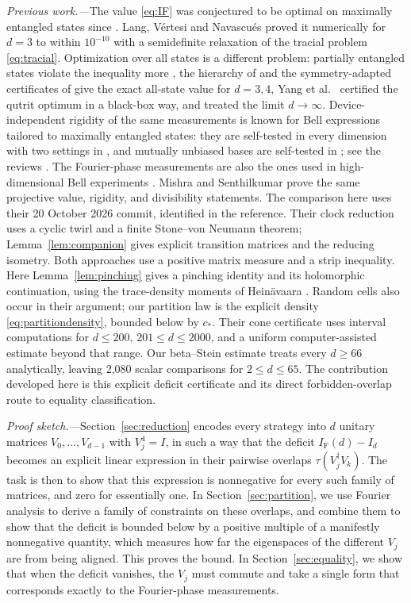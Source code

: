 \documentclass[aps,prl,reprint,superscriptaddress,longbibliography,floatfix,raggedbottom]{revtex4-2}
\newcommand{\tr}{\tau}
\newcommand{\IF}{I_{\mathrm F}}
\begin{document}
\emph{Previous work.---}The value \eqref{eq:IF} was conjectured to be
optimal on maximally entangled states since \cite{DKZ}. Lang, V\'ertesi
and Navascu\'es \cite{LVN} proved it numerically for $d=3$ to within
$10^{-10}$ with a semidefinite relaxation of the tracial problem
\eqref{eq:tracial}. Optimization over all states is a different problem:
partially entangled states violate the inequality more \cite{ADGL}, the
hierarchy of \cite{NPA} and the symmetry-adapted certificates of
\cite{IR} give the exact all-state value for $d=3,4$, Yang et al.\
\cite{Yang} certified the qutrit optimum in a black-box way, and
\cite{ZG,ZRGW} treated the limit $d\to\infty$. Device-independent
rigidity of the same measurements is known for Bell expressions tailored
to maximally entangled states: they are self-tested in every dimension
with two settings in \cite{SATWAP,Sarkar}, and mutually unbiased bases
are self-tested in \cite{Kaniewski,Tavakoli21}; see the reviews
\cite{Brunner,SupicBowles}. The Fourier-phase measurements are also the
ones used in high-dimensional Bell experiments \cite{Vaziri,Dada,Miao26}.
Mishra and Senthilkumar \cite{Mishra26b} prove the same projective value,
rigidity, and divisibility statements. The comparison here uses their
20 October 2026 commit, identified in the reference. Their clock
reduction uses a cyclic twirl and a finite Stone--von Neumann theorem;
Lemma~\ref{lem:companion} gives explicit transition matrices and the
reducing isometry. Both approaches use a positive matrix measure and a
strip inequality. Here Lemma~\ref{lem:pinching} gives a pinching identity
and its holomorphic continuation, using the trace-density moments of
Hein\"avaara \cite[Eq.~(16), proof of Lemma~2.5]{Heinavaara26}.
Random cells also occur in their argument; our partition law is the
explicit density \eqref{eq:partitiondensity}, bounded below by $c_*$.
Their cone certificate uses interval computations for $d\le200$,
$201\le d\le2000$, and a uniform computer-assisted estimate beyond
that range. Our beta--Stein estimate treats every $d\ge66$
analytically, leaving 2,080 scalar comparisons for $2\le d\le65$.
The contribution developed here is this explicit deficit certificate
and its direct forbidden-overlap route to equality classification.

\emph{Proof sketch.---}Section~\ref{sec:reduction} encodes every
strategy into $d$ unitary matrices $V_0,\dots,V_{d-1}$ with $V_j^4=I$,
in such a way that the deficit $\IF(d)-I_d$ becomes an explicit linear
expression in their pairwise overlaps $\tr(V_j^\dagger V_k)$. The task
is then to show that this expression is nonnegative for every such
family of matrices, and zero for essentially one. In
Section~\ref{sec:partition}, we use Fourier analysis to derive a
family of constraints on these overlaps, and combine them to show
that the deficit is bounded below by a
positive multiple of a manifestly nonnegative quantity, which measures
how far the eigenspaces of the different $V_j$ are from being aligned.
This proves the bound. In Section~\ref{sec:equality}, we
show that when the deficit vanishes, the $V_j$ must commute and take a single form that corresponds exactly to the
Fourier-phase measurements.
\end{document}
